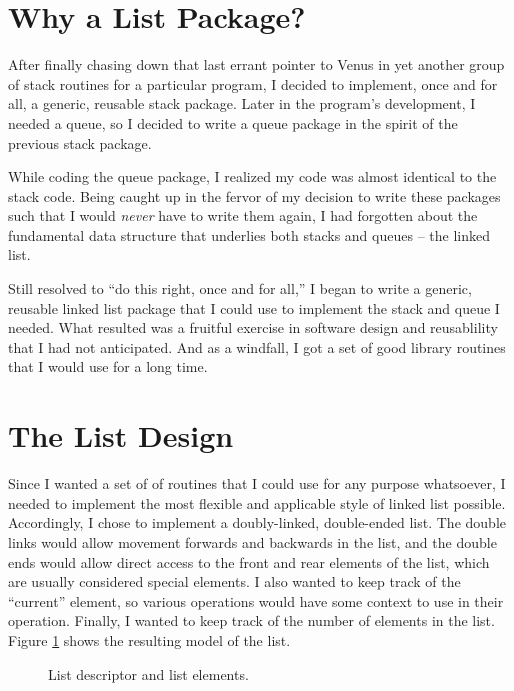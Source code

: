 \newpage
\tableofcontents
\bigskip
\listoffigures
\bigskip
\listoftables


\newpage
\pagestyle{plain}
\setcounter{page}{1}
\section{Why a List Package?}
After finally chasing down that last errant pointer to Venus in yet another
group of stack routines for a particular program, I decided to implement,
once and for all, a generic, reusable stack package.  Later in the program's
development, I needed a queue, so I decided to write a queue package in the
spirit of the previous stack package.

While coding the queue package, I realized my code was almost identical to the
stack code.  Being caught up in the fervor of my decision to write these
packages such that I would {\em never} have to write them again, I had
forgotten about the fundamental data structure that underlies both stacks and
queues -- the linked list.

Still resolved to ``do this right, once and for all,'' I began to write a
generic, reusable linked list package that I could use to implement the stack
and queue I needed.  What resulted was a fruitful exercise in software design
and reusablility that I had not anticipated.  And as a windfall, I got a set
of good library routines that I would use for a long time.


\section{The List Design}
Since I wanted a set of of routines that I could use for any purpose
whatsoever, I needed to implement the most flexible and applicable style of
linked list possible.  Accordingly, I chose to implement a doubly-linked,
double-ended list.  The double links would allow movement forwards and
backwards in the list, and the double ends would allow direct access to the
front and rear elements of the list, which are usually considered special
elements.  I also wanted to keep track of the ``current'' element, so various
operations would have some context to use in their operation.  Finally, I
wanted to keep track of the number of elements in the list.  Figure
\ref{fig:list} shows the resulting model of the list.

\begin{figure}[h]
\begin{center}
	
	\caption{List descriptor and list elements.}
	\label{fig:list}
\end{center}
\end{figure}

